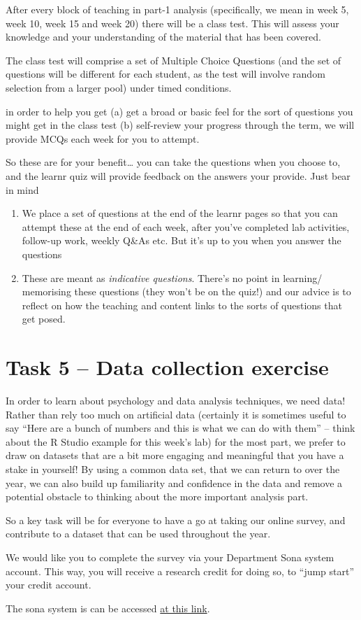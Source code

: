 \documentclass[
]{book}
\begin{document}
After every block of teaching in part-1 analysis (specifically, we mean in week 5, week 10, week 15 and week 20) there will be a class test. This will assess your knowledge and your understanding of the material that has been covered.

The class test will comprise a set of Multiple Choice Questions (and the set of questions will be different for each student, as the test will involve random selection from a larger pool) under timed conditions.

in order to help you get (a) get a broad or basic feel for the sort of questions you might get in the class test (b) self-review your progress through the term, we will provide MCQs each week for you to attempt.

So these are for your benefit\ldots{} you can take the questions when you choose to, and the learnr quiz will provide feedback on the answers your provide. Just bear in mind

\begin{enumerate}
\def\labelenumi{\alph{enumi})}
\item
  We place a set of questions at the end of the learnr pages so that you can attempt these at the end of each week, after you've completed lab activities, follow-up work, weekly Q\&As etc. But it's up to you when you answer the questions
\item
  These are meant as \emph{indicative questions}. There's no point in learning/ memorising these questions (they won't be on the quiz!) and our advice is to reflect on how the teaching and content links to the sorts of questions that get posed.
\end{enumerate}

\hypertarget{task-5-data-collection-exercise}{%
\section{Task 5 -- Data collection exercise}\label{task-5-data-collection-exercise}}

In order to learn about psychology and data analysis techniques, we need data! Rather than rely too much on artificial data (certainly it is sometimes useful to say ``Here are a bunch of numbers and this is what we can do with them'' -- think about the R Studio example for this week's lab) for the most part, we prefer to draw on datasets that are a bit more engaging and meaningful that you have a stake in yourself! By using a common data set, that we can return to over the year, we can also build up familiarity and confidence in the data and remove a potential obstacle to thinking about the more important analysis part.

So a key task will be for everyone to have a go at taking our online survey, and contribute to a dataset that can be used throughout the year.

We would like you to complete the survey via your Department Sona system account. This way, you will receive a research credit for doing so, to ``jump start'' your credit account.

The sona system is can be accessed \href{https://lancs.sona-systems.com}{at this link}.
\end{document}
